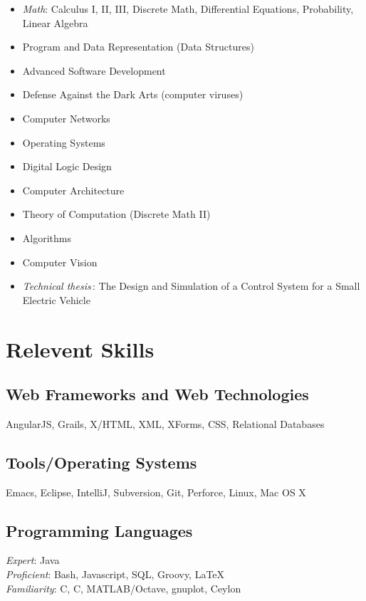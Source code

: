 \documentclass[a4paper,11pt]{article}
\newcommand{\CC}{C\nolinebreak\hspace{-.05em}\raisebox{.4ex}{\tiny\bf
    +}\nolinebreak\hspace{-.10em}\raisebox{.4ex}{\tiny\bf +}}
\def\CC{{C\nolinebreak[4]\hspace{-.05em}\raisebox{.4ex}{\tiny\bf ++}}}
\begin{document}
  \begin{multicols}{2} \raggedright

    \begin{itemize}
    \item \textit{Math}: Calculus I, II, III, Discrete Math, Differential
      Equations, Probability, Linear Algebra
    \item Program and Data Representation (Data Structures)
    \item Advanced Software Development
    \item Defense Against the Dark Arts (computer viruses)
    \item Computer Networks
    \item Operating Systems
    \item Digital Logic Design
    \item Computer Architecture
    \item Theory of Computation (Discrete Math II)
    \item Algorithms
    \item Computer Vision
    \item \textsl{Technical thesis\,}: The Design and Simulation of a Control
      System for a Small Electric Vehicle
    \end{itemize}
  \end{multicols}


  \section*{Relevent Skills}

  \begin{multicols}{2} \raggedright

  \subsection*{Web Frameworks and Web Technologies}

  AngularJS, Grails, X/HTML, XML, XForms, CSS, Relational Databases

  \subsection*{Tools/Operating Systems}

  Emacs, Eclipse, IntelliJ, Subversion, Git, Perforce, Linux, Mac OS X

  \subsection*{Programming Languages}

  \textsl{Expert}: Java \\
  \textsl{Proficient}: Bash, Javascript, SQL, Groovy, \LaTeX \\
  \textsl{Familiarity}: C, \CC, MATLAB/Octave, gnuplot, Ceylon

\end{multicols}
\end{document}
